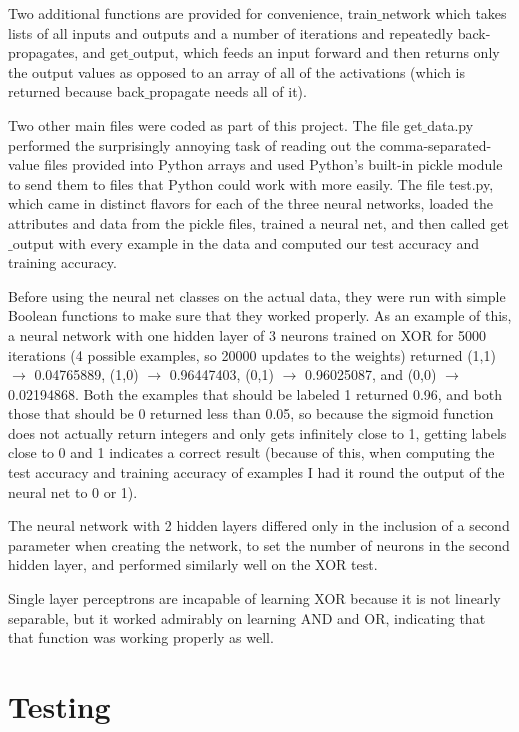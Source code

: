 \documentclass[11pt]{article} %
\begin{document}
Two additional functions are provided for convenience, train$\_$network which takes lists of all inputs and outputs and a number of iterations and repeatedly back-propagates, and get$\_$output, which feeds an input forward and then returns only the output values as opposed to an array of all of the activations (which is returned because back$\_$propagate needs all of it).

Two other main files were coded as part of this project. The file get$\_$data.py performed the surprisingly annoying task of reading out the comma-separated-value files provided into Python arrays and used Python's built-in pickle module to send them to files that Python could work with more easily. The file test.py, which came in distinct flavors for each of the three neural networks, loaded the attributes and data from the pickle files, trained a neural net, and then called get$\_$output with every example in the data and computed our test accuracy and training accuracy.

Before using the neural net classes on the actual data, they were run with simple Boolean functions to make sure that they worked properly. As an example of this, a neural network with one hidden layer of 3 neurons trained on XOR for 5000 iterations (4 possible examples, so 20000 updates to the weights) returned
(1,1) $\rightarrow$ 0.04765889, (1,0) $\rightarrow$ 0.96447403, (0,1) $\rightarrow$ 0.96025087, and (0,0) $\rightarrow$ 0.02194868. Both the examples that should be labeled 1 returned 0.96, and both those that should be 0 returned less than 0.05, so because the sigmoid function does not actually return integers and only gets infinitely close to 1, getting labels close to 0 and 1 indicates a correct result (because of this, when computing the test accuracy and training accuracy of examples I had it round the output of the neural net to 0 or 1).

The neural network with 2 hidden layers differed only in the inclusion of a second parameter when creating the network, to set the number of neurons in the second hidden layer, and performed similarly well on the XOR test.

Single layer perceptrons are incapable of learning XOR because it is not linearly separable, but it worked admirably on learning AND and OR, indicating that that function was working properly as well.

\section{Testing}
\end{document}

